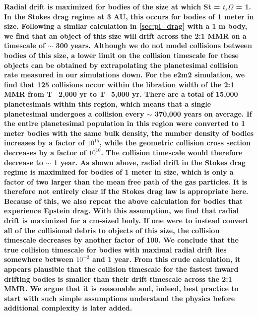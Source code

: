 \documentclass[fleqn,usenatbib]{mnras}
\begin{document}
\textbf{Radial drift is maximized for bodies of the size at which St = $t_{s} \Omega$ = 1. In the Stokes drag regime at 3 AU, this occurs for bodies of 1 meter in size. Following a similar calculation in \ref{sec:pl_drag} with a 1 m body, we find that an object of this size will drift across the 2:1 MMR on a timescale of $\sim$ 300 years. Although we do not model collisions between bodies of this size, a lower limit on the collision timescale for these objects can be obtained by extrapolating the planetesimal collision rate measured in our simulations down. For the e2m2 simulation, we find that 125 collisions occur within the libration width of the 2:1 MMR from T=2,000 yr to  T=5,000 yr. There are a total of 15,000 planetesimals within this region, which means that a single planetesimal undergoes a collision every $\sim$ 370,000 years on average. If the entire planetesimal population in this region were converted to 1 meter bodies with the same bulk density, the number density of bodies increases by a factor of $10^{15}$, while the geometric collision cross section decreases by a factor of $10^{10}$. The collision timescale would therefore decrease to $\sim$ 1 year. As shown above, radial drift in the Stokes drag regime is maximized for bodies of 1 meter in size, which is only a factor of two larger than the mean free path of the gas particles. It is therefore not entirely clear if the Stokes drag law is appropriate here. Because of this, we also repeat the above calculation for bodies that experience Epstein drag. With this assumption, we find that radial drift is maximized for a cm-sized body. If one were to instead convert all of the collisional debris to objects of this size, the collision timescale decreases by another factor of 100. We conclude that the true collision timescale for bodies with maximal radial drift lies somewhere between $10^{-2}$ and 1 year.  From this crude calculation, it appears plausible that the collision timescale for the fastest inward drifting bodies is smaller than their drift timescale across the 2:1 MMR. We argue that it is reasonable and, indeed, best practice to start with such simple assumptions understand the physics before additional complexity is later added.}
\end{document}
